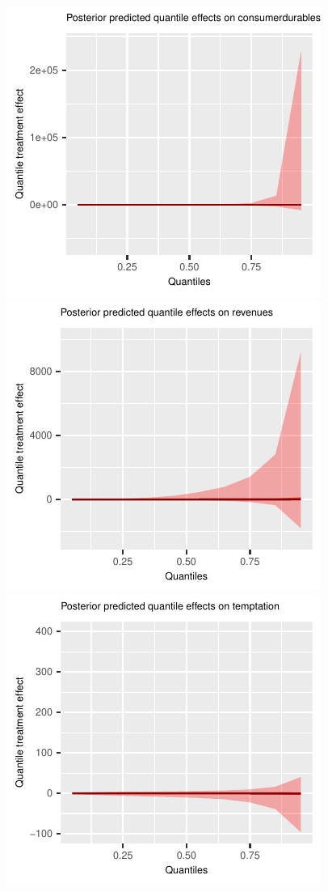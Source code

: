 \documentclass[AER]{AEA}
\begin{document}
\begin{figure}[h!]
    \includegraphics{posterior_predicted_quantile_TEs_consumerdurables_lognormal.pdf}
        \includegraphics{posterior_predicted_quantile_TEs_revenues_lognormal.pdf}\\
    \includegraphics{posterior_predicted_quantile_TEs_temptation_lognormal.pdf}

\end{figure}
\end{document}
